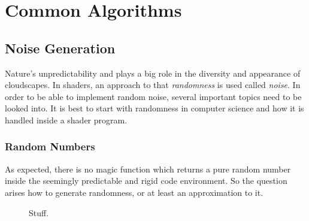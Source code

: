 \section{Common Algorithms}

\subsection{Noise Generation}
\label{section:noise-generation}
Nature's unpredictability and plays a big role in the diversity and appearance of cloudscapes. In shaders, an approach to that \textit{randomness} is used called \textit{\gls{noise}}.
In order to be able to implement random \gls{noise}, several important topics need to be looked into. It is best to start with randomness in computer science and how it is handled inside a shader program.

\subsubsection{Random Numbers}
As expected, there is no magic function which returns a pure random number inside the seemingly predictable and rigid code environment.
So the question arises how to generate randomness, or at least an approximation to it.
\begin{figure}[H]
    \centering
    \caption{Stuff.}
\end{figure}
